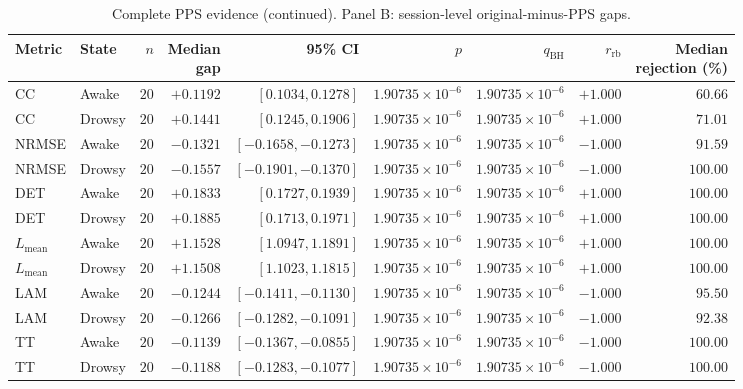 \begin{table}[p]
\centering
\footnotesize
\setlength{\tabcolsep}{2.2pt}
\renewcommand{\arraystretch}{1.08}
\addtocounter{table}{-1}
\caption[]{Complete PPS evidence (continued). Panel B: session-level original-minus-PPS gaps.}
\begin{tabular}{llrrrrrrr}
\toprule
Metric & State & $n$ & \shortstack{Median\\gap} & 95\% CI & $p$ & $q_{\mathrm{BH}}$ & $r_{\mathrm{rb}}$ & \shortstack{Median\\rejection (\%)} \\
\midrule
CC & Awake & $20$ & $+0.1192$ & $[0.1034, 0.1278]$ & $1.90735\!\times\!10^{-6}$ & $1.90735\!\times\!10^{-6}$ & $+1.000$ & $60.66$ \\
CC & Drowsy & $20$ & $+0.1441$ & $[0.1245, 0.1906]$ & $1.90735\!\times\!10^{-6}$ & $1.90735\!\times\!10^{-6}$ & $+1.000$ & $71.01$ \\
NRMSE & Awake & $20$ & $-0.1321$ & $[-0.1658, -0.1273]$ & $1.90735\!\times\!10^{-6}$ & $1.90735\!\times\!10^{-6}$ & $-1.000$ & $91.59$ \\
NRMSE & Drowsy & $20$ & $-0.1557$ & $[-0.1901, -0.1370]$ & $1.90735\!\times\!10^{-6}$ & $1.90735\!\times\!10^{-6}$ & $-1.000$ & $100.00$ \\
DET & Awake & $20$ & $+0.1833$ & $[0.1727, 0.1939]$ & $1.90735\!\times\!10^{-6}$ & $1.90735\!\times\!10^{-6}$ & $+1.000$ & $100.00$ \\
DET & Drowsy & $20$ & $+0.1885$ & $[0.1713, 0.1971]$ & $1.90735\!\times\!10^{-6}$ & $1.90735\!\times\!10^{-6}$ & $+1.000$ & $100.00$ \\
$L_{\mathrm{mean}}$ & Awake & $20$ & $+1.1528$ & $[1.0947, 1.1891]$ & $1.90735\!\times\!10^{-6}$ & $1.90735\!\times\!10^{-6}$ & $+1.000$ & $100.00$ \\
$L_{\mathrm{mean}}$ & Drowsy & $20$ & $+1.1508$ & $[1.1023, 1.1815]$ & $1.90735\!\times\!10^{-6}$ & $1.90735\!\times\!10^{-6}$ & $+1.000$ & $100.00$ \\
LAM & Awake & $20$ & $-0.1244$ & $[-0.1411, -0.1130]$ & $1.90735\!\times\!10^{-6}$ & $1.90735\!\times\!10^{-6}$ & $-1.000$ & $95.50$ \\
LAM & Drowsy & $20$ & $-0.1266$ & $[-0.1282, -0.1091]$ & $1.90735\!\times\!10^{-6}$ & $1.90735\!\times\!10^{-6}$ & $-1.000$ & $92.38$ \\
TT & Awake & $20$ & $-0.1139$ & $[-0.1367, -0.0855]$ & $1.90735\!\times\!10^{-6}$ & $1.90735\!\times\!10^{-6}$ & $-1.000$ & $100.00$ \\
TT & Drowsy & $20$ & $-0.1188$ & $[-0.1283, -0.1077]$ & $1.90735\!\times\!10^{-6}$ & $1.90735\!\times\!10^{-6}$ & $-1.000$ & $100.00$ \\

\end{tabular}
\end{table}
